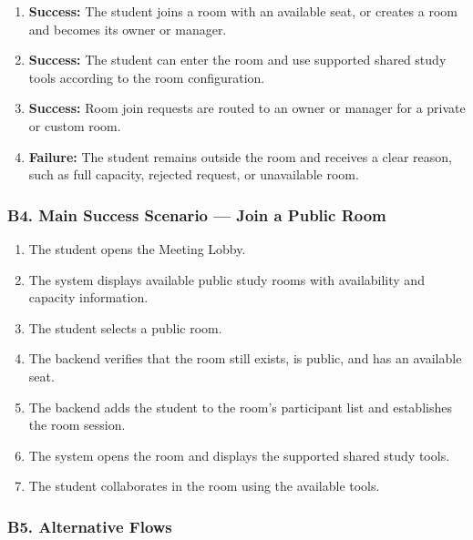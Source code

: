 \documentclass[12pt]{article}
\begin{document}
\begin{enumerate}
\item \textbf{Success:} The student joins a room with an available seat, or creates a room and becomes its owner or manager.
\item \textbf{Success:} The student can enter the room and use supported shared study tools according to the room configuration.
\item \textbf{Success:} Room join requests are routed to an owner or manager for a private or custom room.
\item \textbf{Failure:} The student remains outside the room and receives a clear reason, such as full capacity, rejected request, or unavailable room.
\end{enumerate}
\par\medskip

\hypertarget{sec:b4-main-success-scenario-join-a-public-room}{}
\subsubsection*{B4. Main Success Scenario --- Join a Public Room}
\par\medskip

\begin{enumerate}
\item The student opens the Meeting Lobby.
\item The system displays available public study rooms with availability and capacity information.
\item The student selects a public room.
\item The backend verifies that the room still exists, is public, and has an available seat.
\item The backend adds the student to the room's participant list and establishes the room session.
\item The system opens the room and displays the supported shared study tools.
\item The student collaborates in the room using the available tools.
\end{enumerate}
\par\medskip

\hypertarget{sec:b5-alternative-flows}{}
\subsubsection*{B5. Alternative Flows}
\par\medskip
\end{document}
